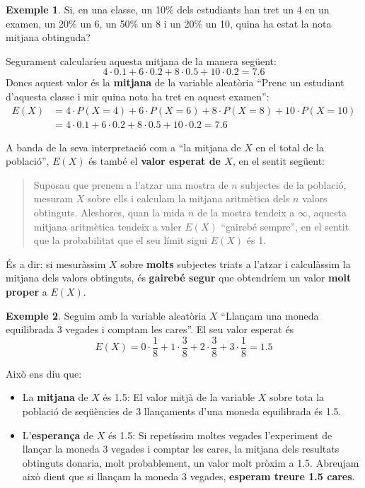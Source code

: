 \documentclass[
]{book}
\theoremstyle{definition}
\theoremstyle{definition}
\newtheorem{example}{Exemple}[chapter]
\theoremstyle{definition}
\theoremstyle{remark}
\begin{document}
\begin{example}
\protect\hypertarget{exm:notes1}{}{\label{exm:notes1} }Si, en una classe, un 10\% dels estudiants han tret un 4 en un examen, un 20\% un 6, un 50\% un 8 i un 20\% un 10, quina ha estat la nota mitjana obtinguda?
\end{example}

Segurament calcularíeu aquesta mitjana de la manera següent:
\[
4\cdot 0.1+6\cdot 0.2+8\cdot 0.5+10\cdot 0.2=7.6
\]
Doncs aquest valor és la \textbf{mitjana} de la variable aleatòria ``Prenc un estudiant d'aquesta classe i mir quina nota ha tret en aquest examen'':
\[
\begin{array}{rl}
E(X)\!\!\!\!\! &=4\cdot P(X=4)+6\cdot P(X=6)+8\cdot P(X=8)+10\cdot P(X=10)\\
& = 4\cdot 0.1+6\cdot 0.2+8\cdot 0.5+10\cdot 0.2=7.6
\end{array}
\]

A banda de la seva interpretació com a ``la mitjana de \(X\) en el total de la població'', \(E(X)\) és també el \textbf{valor esperat de \(X\)}, en el sentit següent:

\begin{quote}
Suposau que prenem a l'atzar una mostra de \(n\) subjectes de la població, mesuram \(X\) sobre ells i calculam la mitjana aritmètica dels \(n\) valors obtinguts. Aleshores, quan la mida \(n\) de la mostra tendeix a \(\infty\), aquesta mitjana aritmètica tendeix a valer \(E(X)\) ``gairebé sempre'', en el sentit que la probabilitat que el seu límit sigui \(E(X)\) és 1.
\end{quote}

És a dir: si mesuràssim \(X\) sobre \textbf{molts} subjectes triats a l'atzar i calculàssim la mitjana dels valors obtinguts, és \textbf{gairebé segur} que obtendríem un valor \textbf{molt proper} a \(E(X)\).

\begin{example}
\protect\hypertarget{exm:unnamed-chunk-15}{}{\label{exm:unnamed-chunk-15} }Seguim amb la variable aleatòria \(X\) ``Llançam una moneda equilibrada 3 vegades i comptam les cares''. El seu valor esperat és
\[
E(X)= 0\cdot \frac{1}{8}+1\cdot \frac{3}{8}+2\cdot \frac{3}{8}+3\cdot \frac{1}{8}=1.5
\]
\end{example}

Això ens diu que:

\begin{itemize}
\item
  La \textbf{mitjana} de \(X\) és 1.5: El valor mitjà de la variable \(X\) sobre tota la població de seqüències de 3 llançaments d'una moneda equilibrada és 1.5.
\item
  L'\textbf{esperança} de \(X\) és 1.5: Si repetíssim moltes vegades l'experiment de llançar la moneda 3 vegades i comptar les cares, la mitjana dels resultats obtinguts donaria, molt probablement, un valor molt pròxim a 1.5. Abreujam això dient que si llançam la moneda 3 vegades, \textbf{esperam treure 1.5 cares}.
\end{itemize}
\end{document}
